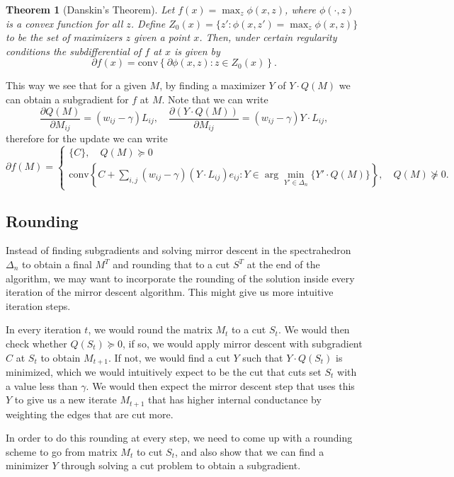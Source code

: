 \documentclass{article}
\newtheorem{theorem}{Theorem}[section]
\begin{document}
\begin{theorem}[Danskin's Theorem]
  Let $f(x) = \max_z \phi(x,z)$, where $\phi(\cdot,z)$ is a convex function for all $z$. Define $Z_0(x) = \{z' : \phi(x,z') = \max_z \phi(x,z)\}$ to be the set of maximizers $z$ given a point $x$. Then, under certain regularity conditions the subdifferential of $f$ at $x$ is given by 
  \[ \partial f(x) = \mathrm{conv}\left\{ \partial \phi(x,z) : z \in Z_0(x)\right\}. \]
\end{theorem}

This way we see that for a given $M$, by finding a maximizer $Y$ of $Y \cdot Q(M)$ we can obtain a subgradient for $f$ at $M$. Note that we can write
\[ \frac{\partial Q(M)}{\partial M_{ij}} = (w_{ij} - \gamma) L_{ij}, \quad \frac{\partial (Y \cdot Q(M))}{\partial M_{ij}} = (w_{ij} - \gamma) Y \cdot L_{ij}, \]
therefore for the update we can write
\[ \partial f(M) = \begin{cases}
			\{C\}, \quad Q(M) \succeq 0 \\
			\mathrm{conv}\left\{C + \sum_{i,j} (w_{ij} - \gamma) \left(Y \cdot L_{ij} \right) e_{ij} : Y \in \arg\min_{Y' \in \Delta_n} \{Y' \cdot Q(M)\} \right\}, \quad Q(M) \not\succeq 0.
			\end{cases} \]


\subsection*{Rounding}

Instead of finding subgradients and solving mirror descent in the spectrahedron $\Delta_n$ to obtain a final $M^T$ and rounding that to a cut $S^T$ at the end of the algorithm, we may want to incorporate the rounding of the solution inside every iteration of the mirror descent algorithm. This might give us more intuitive iteration steps.

In every iteration $t$, we would round the matrix $M_t$ to a cut $S_t$. We would then check whether $Q(S_t) \succeq 0$, if so, we would apply mirror descent with subgradient $C$ at $S_t$ to obtain $M_{t+1}$. If not, we would find a cut $Y$ such that $Y \cdot Q(S_t)$ is minimized, which we would intuitively expect to be the cut that cuts set $S_t$ with a value less than $\gamma$. We would then expect the mirror descent step that uses this $Y$ to give us a new iterate $M_{t+1}$ that has higher internal conductance by weighting the edges that are cut more.

In order to do this rounding at every step, we need to come up with a rounding scheme to go from matrix $M_t$ to cut $S_t$, and also show that we can find a minimizer $Y$ through solving a cut problem to obtain a subgradient.
\end{document}
